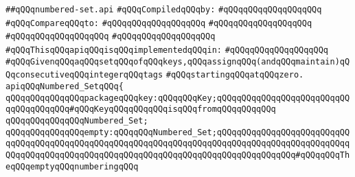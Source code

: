 \label{src/lib/src/numbered-set.api}
\verb|##qQQqnumbered-set.api|\newline
\newline
\verb|#qQQqCompiledqQQqby:|\newline
\verb|#qQQqqQQqqQQqqQQqqQQq|\newline
\newline
\verb|#qQQqCompareqQQqto:|\newline
\verb|#qQQqqQQqqQQqqQQqqQQq|\newline
\verb|#qQQqqQQqqQQqqQQqqQQq|\newline
\verb|#qQQqqQQqqQQqqQQqqQQq|\newline
\verb|#qQQqqQQqqQQqqQQqqQQq|\newline
\newline
\verb|#qQQqThisqQQqapiqQQqisqQQqimplementedqQQqin:|\newline
\verb|#qQQqqQQqqQQqqQQqqQQq|\newline
\newline
\newline
\newline
\verb|#qQQqGivenqQQqaqQQqsetqQQqofqQQqkeys,qQQqassignqQQq(andqQQqmaintain)qQQqconsecutiveqQQqintegerqQQqtags|\newline
\verb|#qQQqstartingqQQqatqQQqzero.|\newline
\newline
\verb|apiqQQqNumbered_SetqQQq{|\newline
\newline
\verb|qQQqqQQqqQQqqQQqpackageqQQqkey:qQQqqQQqKey;qQQqqQQqqQQqqQQqqQQqqQQqqQQqqQQqqQQqqQQq#qQQqKeyqQQqqQQqqQQqisqQQqfromqQQqqQQqqQQq|\newline
\newline
\verb|qQQqqQQqqQQqqQQqNumbered_Set;|\newline
\newline
\verb|qQQqqQQqqQQqqQQqempty:qQQqqQQqNumbered_Set;qQQqqQQqqQQqqQQqqQQqqQQqqQQqqQQqqQQqqQQqqQQqqQQqqQQqqQQqqQQqqQQqqQQqqQQqqQQqqQQqqQQqqQQqqQQqqQQqqQQqqQQqqQQqqQQqqQQqqQQqqQQqqQQqqQQqqQQqqQQqqQQqqQQqqQQqqQQq#qQQqqQQqTheqQQqemptyqQQqnumberingqQQq|\newline
